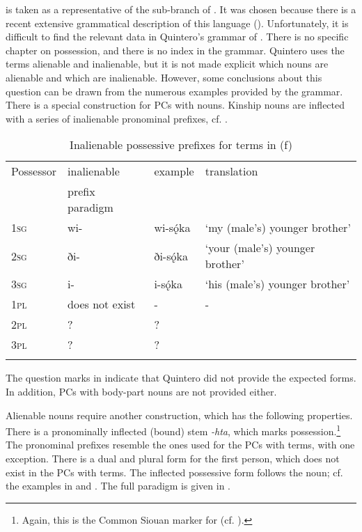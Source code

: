 \documentclass[output=paper]{LSP/langsci}
\begin{document}
 is taken as a representative of the  sub-branch of . It was chosen because there is a recent extensive grammatical description of this language (\citealt{Quintero2004}). Unfortunately, it is difficult to find the relevant data in Quintero's grammar of . There is no specific chapter on possession, and there is no index in the grammar. Quintero uses the terms alienable and inalienable, but it is not made explicit which nouns are alienable and which are inalienable. However, some conclusions about this question can be drawn from the numerous examples provided by the grammar.
There is a special construction for PCs with   nouns. Kinship nouns are inflected with a series of inalienable pronominal prefixes, cf. .

\begin{table}
\caption{Inalienable possessive prefixes for  terms in  (\citealt[481]{Quintero2004}f)} \label{osageinalienable}
\begin{tabular}{ l l l l }
\lsptoprule
Possessor	 & inalienable & example & translation \\
& prefix paradigm & & \\
\midrule
\textsc{1sg} & wi-	& wi-sǫ́ka & `my (male's) younger brother' \\
 
\textsc{2sg} & ði- & ði-sǫ́ka & `your (male's) younger brother' \\
 
\textsc{3sg} & i- & i-sǫ́ka & `his (male's) younger brother' \\
 
\textsc{1pl} & does not exist &	- & - \\
 
\textsc{2pl} & ? & ? & \\
 
\textsc{3pl} & ? & ? & \\
\lspbottomrule
\end{tabular}
\end{table}
 
The question marks in  indicate that Quintero did not provide the expected forms. In addition, PCs with  body-part nouns are not provided either.

Alienable nouns require another construction, which has the following properties. There is a pronominally inflected (bound) stem \textit{-hta}, which marks possession.\footnote{Again, this is the Common Siouan marker for  (cf. \citealt{RankinEtAl2015AccessMay}).} The pronominal prefixes resemble the ones used for the PCs with   terms, with one exception. There is a dual and plural form for the first person, which does not exist in the PCs with   terms. The inflected possessive form follows the  noun; cf. the examples in  and . The full paradigm is given in .
\end{document}
